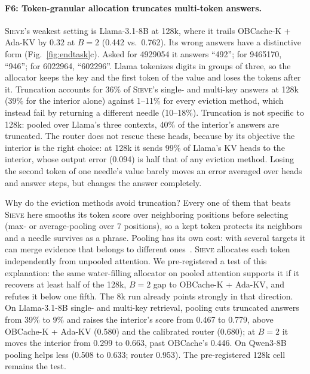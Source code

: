 \documentclass{article}
\newif\ifshowtbd \showtbdtrue
\newcommand{\tbd}[1]{\ifshowtbd{\color{tbdcol}\textbf{TBD}~#1}\else\ifhmode\unskip\fi\fi}
\newif\ifshowest \showesttrue
\DeclareRobustCommand{\est}[1]{\ifshowest{\color{estcol}#1$^{\dagger}$}\else---\fi}
\DeclareRobustCommand{\estonly}[1]{\ifshowest#1\else\ifhmode\unskip\fi\fi}
\newcommand{\sieve}{\textsc{Sieve}}
\theoremstyle{definition}
\begin{document}
\paragraph{F6: Token-granular allocation truncates multi-token answers.}
\sieve{}'s weakest setting is Llama-3.1-8B at 128k, where it trails OBCache-K + Ada-KV by $0.32$ at $B=2$ (0.442 vs.\ 0.762).  Its wrong answers have a distinctive form (Fig.~\ref{fig:endtask}c).  Asked for 4929054 it answers ``492''; for 9465170, ``946''; for 6022964, ``602296''.  Llama tokenizes digits in groups of three, so the allocator keeps the key and the first token of the value and loses the tokens after it.  Truncation accounts for 36\% of \sieve{}'s single- and multi-key answers at 128k (39\% for the interior alone) against 1--11\% for every eviction method, which instead fail by returning a different needle (10--18\%).  Truncation is not specific to 128k: pooled over Llama's three contexts, 40\% of the interior's answers are truncated.  The router does not rescue these heads, because by its objective the interior is the right choice: at 128k it sends 99\% of Llama's KV heads to the interior, whose output error (0.094) is half that of any eviction method.  Losing the second token of one needle's value barely moves an error averaged over heads and answer steps, but changes the answer completely.

Why do the eviction methods avoid truncation?  Every one of them that beats \sieve{} here smooths its token score over neighboring positions before selecting (max- or average-pooling over 7 positions), so a kept token protects its neighbors and a needle survives as a phrase.  Pooling has its own cost: with several targets it can merge evidence that belongs to different ones~\citep{zhang2026fixedcontract}.  \sieve{} allocates each token independently from unpooled attention.  We pre-registered a test of this explanation: the same water-filling allocator on pooled attention supports it if it recovers at least half of the 128k, $B=2$ gap to OBCache-K + Ada-KV, and refutes it below one fifth.  The 8k run already points strongly in that direction.  On Llama-3.1-8B single- and multi-key retrieval, pooling cuts truncated answers from 39\% to 9\% and raises the interior's score from 0.467 to 0.779, above OBCache-K + Ada-KV (0.580) and the calibrated router (0.680); at $B=2$ it moves the interior from 0.299 to 0.663, past OBCache's 0.446.  On Qwen3-8B pooling helps less (0.508 to 0.633; router 0.953).  The pre-registered 128k cell remains the test. 
\end{document}

